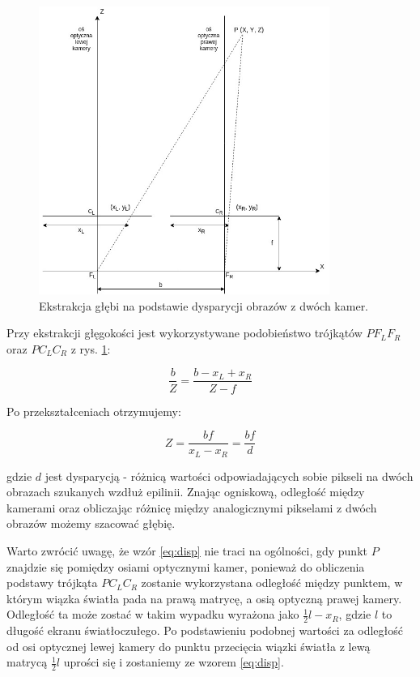 \documentclass[oneside, eng]{mgr}
\begin{document}
\begin{figure}
	\centering
	\includegraphics[width=9.5cm]{ekstrakcja.jpg}
	\caption{Ekstrakcja głębi na podstawie dysparycji obrazów z dwóch kamer. }
	\label{fig:extraction}
\end{figure}

Przy ekstrakcji głęgokości jest wykorzystywane podobieństwo trójkątów $P F_L F_R$ oraz $P C_L C_R$ z rys. \ref{fig:extraction}:

\begin{equation}
	\frac{b}{Z} = \frac{b-x_L+x_R}{Z-f}
	\label{eq:disp}
\end{equation}

Po przekształceniach otrzymujemy:

\begin{equation}
	Z = \frac{bf}{x_L-x_R} = \frac{bf}{d}
\end{equation}

gdzie $d$ jest dysparycją - różnicą wartości odpowiadających sobie pikseli na dwóch obrazach szukanych wzdłuż epilinii.
Znając ogniskową, odległość między kamerami oraz obliczając różnicę między analogicznymi pikselami z dwóch obrazów możemy szacować głębię.

Warto zwrócić uwagę, że wzór \ref{eq:disp} nie traci na ogólności, gdy punkt $P$ znajdzie się pomiędzy osiami optycznymi kamer, ponieważ do obliczenia podstawy trójkąta $P C_L C_R$ zostanie wykorzystana odległość między punktem, w którym wiązka światła pada na prawą matrycę, a osią optyczną prawej kamery. Odległość ta może zostać w takim wypadku wyrażona jako $\frac{1}{2}l-x_R$, gdzie $l$ to długość ekranu światłoczułego. Po podstawieniu podobnej wartości za odległość od osi optycznej lewej kamery do punktu przecięcia wiązki światła z lewą matrycą $\frac{1}{2}l$ uprości się i zostaniemy ze wzorem \ref{eq:disp}.
\end{document}
